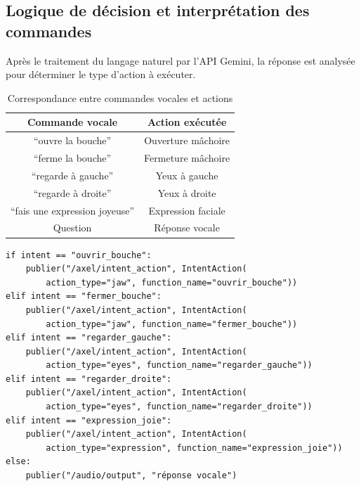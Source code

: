 \subsection{Logique de décision et interprétation des commandes}

Après le traitement du langage naturel par l'API Gemini, la réponse est analysée pour déterminer le type d'action à exécuter.

\begin{table}[H]
\centering
\caption{Correspondance entre commandes vocales et actions}
\begin{tabular}{|c|c|}
\hline
\textbf{Commande vocale} & \textbf{Action exécutée} \\
\hline
``ouvre la bouche'' & Ouverture mâchoire \\
``ferme la bouche'' & Fermeture mâchoire \\
``regarde à gauche'' & Yeux à gauche \\
``regarde à droite'' & Yeux à droite \\
``fais une expression joyeuse'' & Expression faciale \\
Question & Réponse vocale \\
\hline
\end{tabular}
\end{table}

\begin{verbatim}
if intent == "ouvrir_bouche":
    publier("/axel/intent_action", IntentAction(
        action_type="jaw", function_name="ouvrir_bouche"))
elif intent == "fermer_bouche":
    publier("/axel/intent_action", IntentAction(
        action_type="jaw", function_name="fermer_bouche"))
elif intent == "regarder_gauche":
    publier("/axel/intent_action", IntentAction(
        action_type="eyes", function_name="regarder_gauche"))
elif intent == "regarder_droite":
    publier("/axel/intent_action", IntentAction(
        action_type="eyes", function_name="regarder_droite"))
elif intent == "expression_joie":
    publier("/axel/intent_action", IntentAction(
        action_type="expression", function_name="expression_joie"))
else:
    publier("/audio/output", "réponse vocale")
\end{verbatim}

